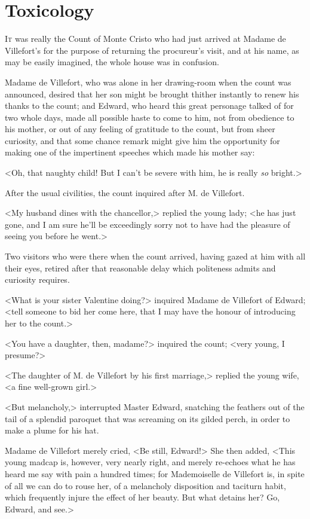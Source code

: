 \chapter{Toxicology} 

 \lettrine{I}{t} was really the Count of Monte Cristo who had just arrived at Madame de Villefort's for the purpose of returning the procureur's visit, and at his name, as may be easily imagined, the whole house was in confusion. 

 Madame de Villefort, who was alone in her drawing-room when the count was announced, desired that her son might be brought thither instantly to renew his thanks to the count; and Edward, who heard this great personage talked of for two whole days, made all possible haste to come to him, not from obedience to his mother, or out of any feeling of gratitude to the count, but from sheer curiosity, and that some chance remark might give him the opportunity for making one of the impertinent speeches which made his mother say: 

 <Oh, that naughty child! But I can't be severe with him, he is really \textit{so} bright.> 

 After the usual civilities, the count inquired after M. de Villefort. 

 <My husband dines with the chancellor,> replied the young lady; <he has just gone, and I am sure he'll be exceedingly sorry not to have had the pleasure of seeing you before he went.> 

 Two visitors who were there when the count arrived, having gazed at him with all their eyes, retired after that reasonable delay which politeness admits and curiosity requires. 

 <What is your sister Valentine doing?> inquired Madame de Villefort of Edward; <tell someone to bid her come here, that I may have the honour of introducing her to the count.> 

 <You have a daughter, then, madame?> inquired the count; <very young, I presume?> 

 <The daughter of M. de Villefort by his first marriage,> replied the young wife, <a fine well-grown girl.> 

 <But melancholy,> interrupted Master Edward, snatching the feathers out of the tail of a splendid paroquet that was screaming on its gilded perch, in order to make a plume for his hat. 

 Madame de Villefort merely cried, <Be still, Edward!> She then added, <This young madcap is, however, very nearly right, and merely re-echoes what he has heard me say with pain a hundred times; for Mademoiselle de Villefort is, in spite of all we can do to rouse her, of a melancholy disposition and taciturn habit, which frequently injure the effect of her beauty. But what detains her? Go, Edward, and see.> 

